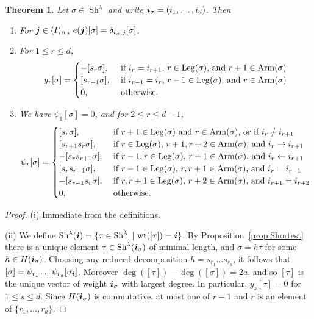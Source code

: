 \documentclass[twoside,11pt,reqno,letter]{amsart}
\numberwithin{equation}{section}
\newtheorem{Theorem}[equation]{Theorem}
\theoremstyle{definition}  %
\def\bi{\text{\boldmath$i$}}
\def\bj{\text{\boldmath$j$}}
\newcommand{\words}{\langle I \rangle}
\newcommand{\Arm}{\operatorname{Arm}}
\newcommand{\Leg}{\operatorname{Leg}}
\newcommand{\Sh}{\operatorname{Sh}}
\newcommand{\0}{{\bar 0}}
\newcommand{\1}{{\bar 1}}
\newcommand{\la}{\lambda}
\newcommand{\al}{\alpha}
\newcommand{\si}{\sigma}
\newcommand{\de}{\delta}
\def\nslash{\:\notslash\:}
\def\wt{{\operatorname{wt}}}
\begin{document}
{\begin{Theorem}\label{thm:KLRonBasis}
  Let $\si \in \Sh^\la$ and write $\bi_\si = (i_1, \dots, i_d)$. Then
  \begin{enumerate}
    \item For $\bj \in \words_\al$, $e(\bj) [\si] = \de_{\bi_\si, \bj} [\si]$.
    \item For $1 \leq r \leq d$,
          \[ y_r [\si] = \begin{cases}
             -[s_r \si],& \textup{ if $i_r = i_{r+1}$, $r \in \Leg(\si)$, and $r+1 \in \Arm(\si)$}\\
             [s_{r-1} \si],& \textup{ if $i_{r-1} = i_r$, $r-1 \in \Leg(\si)$, and $r \in \Arm(\si)$}\\
             0,& \textup{ otherwise.}
          \end{cases} \]
    \item We have $\psi_1 [\si] = 0$, and for $2 \leq r \leq d-1$, 
          \[ \psi_r [\si] = \begin{cases}
             [s_r \si],& \textup{ if $r+1 \in \Leg(\si)$ and $r \in \Arm(\si)$, or if $i_r \nslash i_{r+1}$}\\
             [s_{r+1} s_r \si],& \textup{ if $r \in \Leg(\si)$, $r+1, r+2 \in \Arm(\si)$, and $i_r \to i_{r+1}$}\\
             -[s_r s_{r+1} \si],& \textup{ if $r-1, r \in \Leg(\si)$, $r+1 \in \Arm(\si)$, and $i_r \leftarrow i_{r+1}$}\\
             [s_r s_{r-1} \si],& \textup{ if $r-1 \in \Leg(\si)$, $r, r+1 \in \Arm(\si)$, and $i_r = i_{r-1}$}\\
             -[s_{r-1} s_r \si],& \textup{ if $r, r+1 \in \Leg(\si)$, $r+2 \in \Arm(\si)$, and $i_{r+1} = i_{r+2}$}\\
             0,& \textup{ otherwise.}
          \end{cases} \]
  \end{enumerate}
\end{Theorem}






\begin{proof}
  (i) Immediate from the definitions.

  (ii) We define $\Sh^\la(\bi) = \{\tau \in \Sh^\la\ |\ \wt([\tau]) = \bi\}$. By Proposition~\ref{prop:Shortest} there is a unique element $\tau \in \Sh^\la(\bi_\si)$ of minimal length, and $\si = h \tau$ for some $h \in H(\bi_\si)$. Choosing any reduced decomposition $h = s_{r_1} \dots s_{r_a}$, it follows that $[\si] = \psi_{r_1} \dots \psi_{r_a} [\si_\bi]$. Moreover $\deg([\tau])-\deg([\si]) = 2a$, and so $[\tau]$ is the unique vector of weight $\bi_\si$ with largest degree. In particular, $y_s [\tau] = 0$ for $1 \leq s \leq d$.
Since $H(\bi_\si)$ is commutative, at most one of $r-1$ and $r$ is an element of $\{r_1, \dots, r_a\}$.


\end{proof}}
\end{document}
